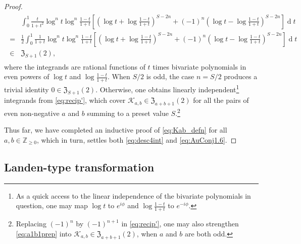 \documentclass[final,notitlepage,12pt,reqno]{amsart}
\DeclareMathOperator{\D}{d}
\theoremstyle{plain}
\theoremstyle{definition}
\numberwithin{equation}{section}
\begin{document}
\begin{proof}
\begin{align}
\begin{split}&\int_{0}^1\frac{t}{1+t^{2}}\log ^{n}t\log^{n}\frac{1-t}{1+t}\left[\left(\log t+\log\frac{1-t}{1+t}\right)^{S-2n}+(-1)^{n}\left(\log t-\log\frac{1-t}{1+t}\right)^{S-2n}\right]\D t\\={}&\frac{1}{2}\int_{0}^1\frac{1}{1+t}\log ^{n}t\log^{n}\frac{1-t}{1+t}\left[\left(\log t+\log\frac{1-t}{1+t}\right)^{S-2n}+(-1)^{n}\left(\log t-\log\frac{1-t}{1+t}\right)^{S-2n}\right]\D t\\\in{}&\mathfrak Z_{S+1}(2),
\end{split}\label{eq:recip'}
\end{align} where the integrands are rational functions of $t$ times  bivariate polynomials in even powers of $\log t$ and $\log\frac{1-t}{1+t}$. When  $ S/2$ is odd, the case  $ n=S/2$ produces a trivial identity $ 0\in\mathfrak Z_{S+1}(2)$. Otherwise, one obtains linearly independent\footnote{As a quick access to the linear independence of the bivariate polynomials in question, one may map $ \log t$ to $ e^{i\phi}$ and $ \log\frac{1-t}{1+t}$ to $ e^{-i\phi}$. } integrands from \eqref{eq:recip'}, which cover   $ \mathscr K_{a,b}\in \mathfrak Z_{a+b+1}(2)$ for all the pairs of even non-negative   $ a$ and  $b$   summing to  a preset value $S$.\footnote{Replacing $ (-1)^n$ by $ (-1)^{n+1}$ in \eqref{eq:recip'}, one may also strengthen    \eqref{eq:a1b1prep} into    $ \mathscr K_{a,b}\in \mathfrak Z_{a+b+1}(2)$, when $a$ and $b$ are both odd.}
                  
Thus far, we have completed an inductive proof of \eqref{eq:Kab_defn} for all $ a,b\in\mathbb Z_{\geq0}$, which in turn, settles both   \eqref{eq:desc4int} and  \eqref{eq:AuConj1.6}. \end{proof}\subsection{Landen-type transformation}
\end{document}

